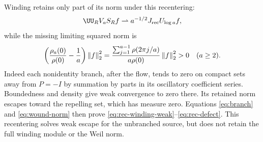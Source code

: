 Winding retains only part of its norm under this recentering:
\begin{equation}\label{eq:rec-winding-weak}
\UU_RV_aS_Rf\rightharpoonup
a^{-1/2}J_{\rm rec}U_{\log a}f ,
\end{equation}
while the missing limiting squared norm is
\begin{equation}\label{eq:rec-defect}
\left(\frac{\rho_a(0)}{\rho(0)}-\frac1a\right)\left\lVert f\right\rVert_2^2
=\frac{\sum_{j=1}^{a-1}\rho(2\pi j/a)}
       {a\rho(0)}\left\lVert f\right\rVert_2^2>0\quad(a\ge2).
\end{equation}
Indeed each nonidentity branch, after the flow, tends to zero
on compact sets away from $P=-I$ by summation by parts in
its oscillatory coefficient series. Boundedness and density
give weak convergence to zero there. Its retained norm escapes
toward the repelling set, which has measure zero. Equations
\eqref{eq:branch} and \eqref{eq:wound-norm} then prove
\eqref{eq:rec-winding-weak}--\eqref{eq:rec-defect}.
This recentering solves weak escape for the unbranched \Ltwo{}
source, but does not retain the full winding module or the
Weil norm.

